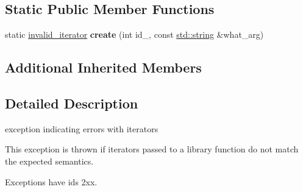 \subsection*{Static Public Member Functions}
\begin{DoxyCompactItemize}
\item 
static \hyperlink{classnlohmann_1_1detail_1_1invalid__iterator}{invalid\+\_\+iterator} {\bfseries create} (int id\+\_\+, const \hyperlink{namespacenlohmann_1_1detail_a1ed8fc6239da25abcaf681d30ace4985ab45cffe084dd3d20d928bee85e7b0f21}{std\+::string} \&what\+\_\+arg)\hypertarget{classnlohmann_1_1detail_1_1invalid__iterator_a4e849260a3caa1b288c7e619130c6c09}{}\label{classnlohmann_1_1detail_1_1invalid__iterator_a4e849260a3caa1b288c7e619130c6c09}

\end{DoxyCompactItemize}
\subsection*{Additional Inherited Members}


\subsection{Detailed Description}
exception indicating errors with iterators 

This exception is thrown if iterators passed to a library function do not match the expected semantics.

Exceptions have ids 2xx.

